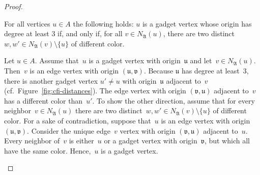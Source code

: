 \documentclass[]{lmcs}
\newcommand{\set}[1]{\lbrace #1 \rbrace}
\newcommand{\StructV}{A}
\newcommand{\vertA}{u}
\newcommand{\vertB}{v}
\newcommand{\vertC}{w}
\newcommand{\StructA}{\mathfrak{A}}
\newcommand{\neighbors}[2]{N_{#1}(#2)}
\newcommand{\bVertA}{\mathfrak{u}}
\newcommand{\bVertB}{\mathfrak{v}}
\newenvironment{claimproof}[1][\proofname]{\begin{claimprooftemp}[#1]\renewcommand*{\qedsymbol}{\(\dashv\)}}{\end{claimprooftemp}}
\begin{document}
\begin{proof}
	\begin{clm}
		\label{clm:define-gadget-vertices}
		For all vertices $\vertA\in \StructV$ the following holds:
		$\vertA$ is a gadget vertex whose origin has degree at least $3$ if, and only if,
			for all $\vertB \in \neighbors{\StructA}{\vertA}$,
			there are two distinct $\vertC,\vertC' \in \neighbors{\StructA}{\vertB} \setminus \set{\vertA}$ of different color.
	\end{clm}
	\begin{claimproof}
	 	Let $\vertA\in \StructV$.
		Assume that~$\vertA$ is a gadget vertex with origin~$\bVertA$
		and let~$\vertB \in \neighbors{\StructA}{\vertA}$.
		Then~$\vertB$ is an edge vertex with origin $(\bVertA,\bVertB)$.
		Because $\bVertA$ has degree at least~$3$,
		there is another gadget vertex $\vertA'\neq \vertA$ with origin~$\bVertA$
		adjacent to~$\vertB$ (cf.~Figure~\ref{fig:cfi-distances}).
		The edge vertex with origin $(\bVertB,\bVertA)$ adjacent to~$\vertB$
		has a different color than~$\vertA'$.
		To show the other direction,
		assume that
		for every neighbor~$\vertB\in \neighbors{\StructA}{\vertA}$
		there are two distinct~$\vertC,\vertC' \in \neighbors{\StructA}{\vertB} \setminus \set{\vertA}$ of different color.
		For a sake of contradiction,
		suppose that~$\vertA$ is an edge vertex
		with origin $(\bVertA,\bVertB)$.
		Consider the unique edge~$\vertB$ vertex with origin $(\bVertB,\bVertA)$
		adjacent to~$\vertA$.
		Every neighbor of~$\vertB$ is either~$\vertA$ or a gadget vertex with origin~$\bVertB$,
		but which all have the same color.
		Hence,~$\vertA$ is a gadget vertex.
	\end{claimproof}
	

\end{proof}
\end{document}
